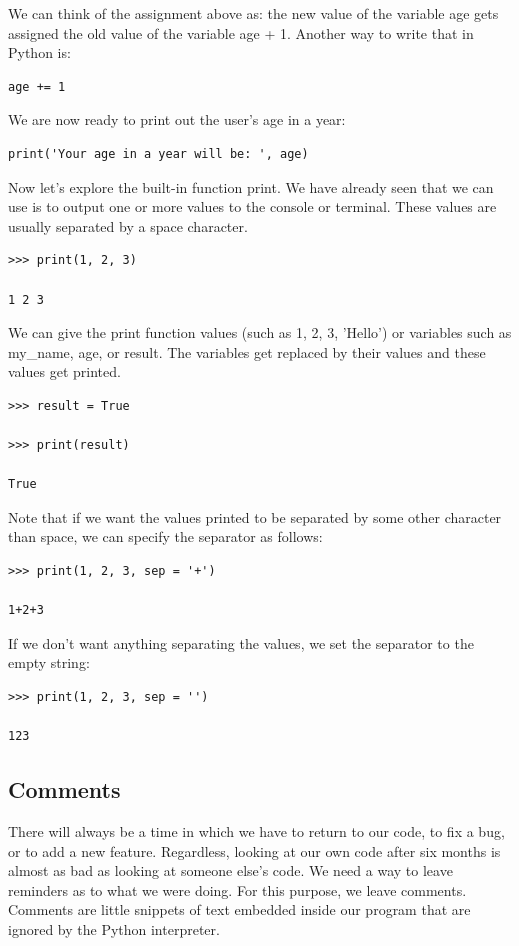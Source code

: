 \documentclass{article}
\begin{document}
We can think of the assignment above as:  the new value of the variable age gets assigned the old value of the variable age + 1.  Another way to write that in Python is:

\begin{lstlisting}
age += 1
\end{lstlisting}

We are now ready to print out the user's age in a year:

\begin{lstlisting}
print('Your age in a year will be: ', age) 
\end{lstlisting}

Now let's explore the built-in function print.  We have already seen that we can use is to output one or more values to the console or terminal. These values are usually separated by a space character.

\begin{lstlisting}
>>> print(1, 2, 3)

1 2 3
\end{lstlisting}

We can give the print function values (such as 1, 2, 3, 'Hello') or variables such as my{\_}name, age, or result.  The variables get replaced by their values and these values get printed.

\begin{lstlisting}
>>> result = True

>>> print(result)

True
\end{lstlisting}


Note that if we want the values printed to be separated by some other character than space, we can specify the separator as follows:

\begin{lstlisting}
>>> print(1, 2, 3, sep = '+')

1+2+3
\end{lstlisting}

If we don't want anything separating the values, we set the separator to the empty string:
\begin{lstlisting}
>>> print(1, 2, 3, sep = '')

123
\end{lstlisting}

\subsection{Comments}
There will always be a time in which we have to return to our code, to fix a bug, or to add a new feature. Regardless, looking at our own code after six months is almost as bad as looking at someone else's code. We need a way to leave reminders as to what we were doing.  For this purpose, we leave comments. Comments are little snippets of text embedded inside our program that are ignored by the Python interpreter. 
\end{document}
